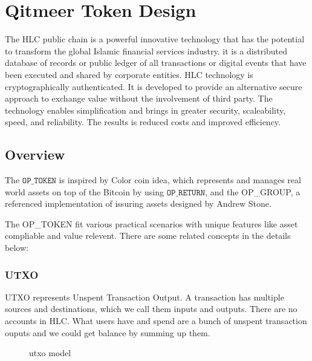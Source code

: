 \documentclass[a4paper,11pt]{article}
\begin{document}
\section{Qitmeer Token Design}

The HLC public chain is a powerful innovative technology that has the potential to transform the global Islamic financial services industry. it is a distributed database of records or public ledger of all transactions or digital events that have been executed and shared by corporate entities. HLC technology is cryptographically authenticated. It is developed to provide an alternative secure approach to exchange value without the involvement of third party. The technology enables simplification and brings in greater security, scaleability, speed, and reliability. The results is reduced costs and improved efficiency. 

\subsection{Overview}

The $\texttt{OP\_TOKEN}$ is inspired by Color coin idea, which represents and manages real world assets on top of the Bitcoin by using $\texttt{OP\_RETURN}$, and the OP\_GROUP, a referenced implementation of issuring assets designed by Andrew Stone.

The OP\_TOKEN fit various practical scenarios with unique features like asset compliable and value relevent. There are some related concepts in the details below:  

\subsubsection{UTXO}

UTXO represents Unspent Transaction Output. A transaction has multiple sources and destinations, which we call them inputs and outputs. There are no accounts in HLC. What users have and spend are a bunch of unspent transaction ouputs and we could get balance by summing up them. 

\begin{figure}[hbt]
	\centerline{%
	}
\caption{utxo model}
\end{figure}
\end{document}

